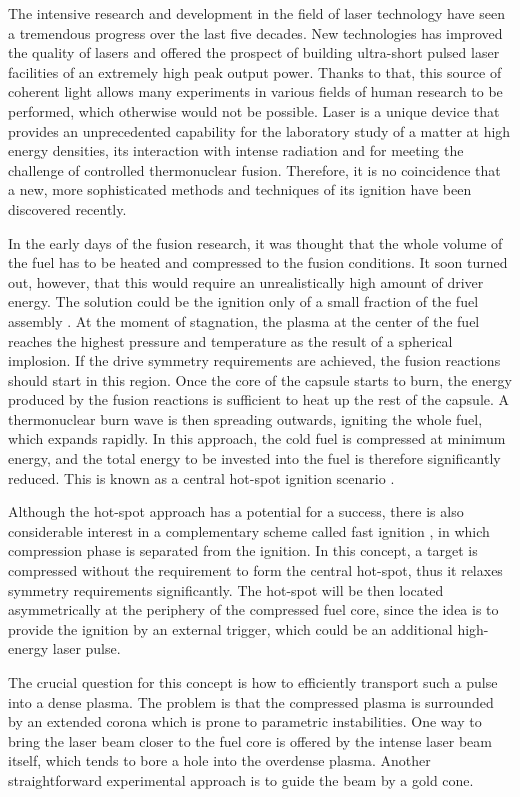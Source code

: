 The intensive research and development in the field of laser technology have seen a tremendous progress over the last five decades. New technologies has improved the quality of lasers and offered the prospect of building ultra-short pulsed laser facilities of an extremely high peak output power. Thanks to that, this source of coherent light allows many experiments in various fields of human research to be performed, which otherwise would not be possible. Laser is a unique device that provides an unprecedented capability for the laboratory study of a matter at high energy densities, its interaction with intense radiation and for meeting the challenge of controlled thermonuclear fusion. Therefore, it is no coincidence that a new, more sophisticated methods and techniques of its ignition have been discovered recently.

In the early days of the fusion research, it was thought that the whole volume of the fuel has to be heated and compressed to the fusion conditions. It soon turned out, however, that this would require an unrealistically high amount of driver energy. The solution could be the ignition only of a small fraction of the fuel assembly \cite{pfalzner}. At the moment of stagnation, the plasma at the center of the fuel reaches the highest pressure and temperature as the result of a spherical implosion. If the drive symmetry requirements are achieved, the fusion reactions should start in this region. Once the core of the capsule starts to burn, the energy produced by the fusion reactions is sufficient to heat up the rest of the capsule. A thermonuclear burn wave is then spreading outwards, igniting the whole fuel, which expands rapidly. In this approach, the cold fuel is compressed at minimum energy, and the total energy to be invested into the fuel is therefore significantly reduced. This is known as a central hot-spot ignition scenario \cite{ribeyre}.

Although the hot-spot approach has a potential for a success, there is also considerable interest in a complementary scheme called fast ignition \cite{atzeni}, in which compression phase is separated from the ignition. In this concept, a target is compressed without the requirement to form the central hot-spot, thus it relaxes symmetry requirements significantly. The hot-spot will be then located asymmetrically at the periphery of the compressed fuel core, since the idea is to provide the ignition by an external trigger, which could be an additional high-energy laser pulse.

The crucial question for this concept is how to efficiently transport such a pulse into a dense plasma. The problem is that the compressed plasma is surrounded by an extended corona which is prone to parametric instabilities. One way to bring the laser beam closer to the fuel core is offered by the intense laser beam itself, which tends to bore a hole into the overdense plasma. Another straightforward experimental approach is to guide the beam by a gold cone.

